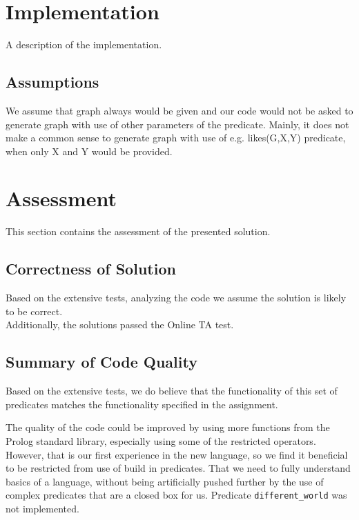 \documentclass[11pt, a4paper]{article}
\begin{document}
\section{Implementation}
A description of the implementation.

\subsection{Assumptions}
We assume that graph always would be given and our code would not be asked to generate graph with use of other parameters of the predicate. Mainly, it does not make a common sense to generate graph with use of e.g. likes(G,X,Y) predicate, when only X and Y would be provided. 

\section{Assessment}
This section contains the assessment of the presented solution.


\subsection{Correctness of Solution}
Based on the extensive tests, analyzing the code we assume the solution is likely to be correct.
\\
Additionally, the solutions passed the Online TA test.

\subsection{Summary of Code Quality}
Based on the extensive tests, we do believe that the functionality of this set of predicates matches the functionality specified in the assignment. 

The quality of the code could be improved by using more functions from the Prolog standard library, especially using some of the restricted operators.  However, that is our first experience in the new language, so we find it beneficial to be restricted from use of build in predicates. That we need to fully understand basics of a language, without being artificially pushed further by the use of complex predicates that are a closed box for us.  Predicate \texttt{different\_world} was not implemented.
\end{document}
